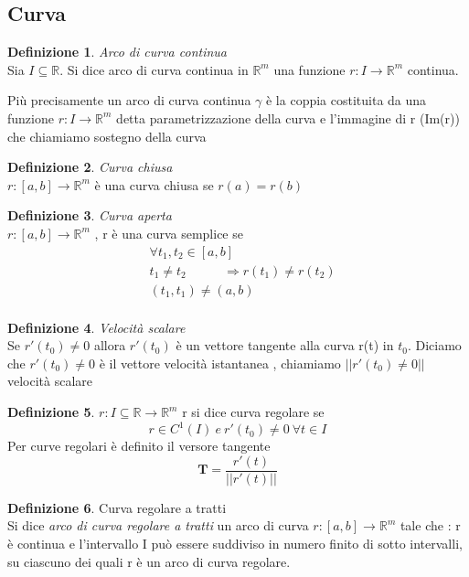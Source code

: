 \documentclass{article}
\theoremstyle{definition}
\newtheorem*{definizione}{Definizione}
\newcommand{\R}{\mathbb{R}}
\begin{document}
	\subsection{Curva}
	\begin{definizione}
		\textit{    Arco di curva continua \\
		}    Sia $ I \subseteq \R$. Si dice arco di curva continua in $\R^m$ una funzione $r:I \rightarrow \R^m$ continua.
	\end{definizione}
	Più precisamente un arco di curva continua $\gamma$ è la coppia costituita da una funzione $r:I \rightarrow \R^m$ detta parametrizzazione della curva e l'immagine di r (Im(r)) che chiamiamo sostegno della curva
	\begin{definizione}
		\textit{   Curva chiusa \\
		}    $r:[a,b] \rightarrow\R^m $ è una curva chiusa se $r(a)=r(b)$
	\end{definizione}
	\begin{definizione}
		\textit{Curva aperta} \\
		$r:[a,b] \rightarrow\R^m $ , r è una curva semplice se 
		\begin{equation*}
			\begin{split}
				&\forall t_1,t_2 \in [a,b] \\
				&t_1 \neq t_2 \qquad \ \ \ \  \Rightarrow r(t_1)\neq r(t_2) \\
				&(t_1,t_1)\neq ( a,b) \\
			\end{split}
		\end{equation*}
	\end{definizione}
	\begin{definizione}
		\textit{Velocità scalare}\\
		Se $r'(t_0)\neq 0$ allora $r'(t_0)$ è un vettore tangente alla curva r(t) in $t_0$. Diciamo che $r'(t_0)\neq 0$ è il vettore velocità istantanea , chiamiamo $||r'(t_0)\neq 0||$ velocità scalare
	\end{definizione}
	\begin{definizione}
		$r:I\subseteq\R \rightarrow \R^m$ r si dice curva regolare se $$r \in C^1(I) \ e \ r'(t_0)\neq 0  \  \forall t \in I $$
		Per curve regolari è definito il versore tangente 
		$$\textbf{T}= \frac{r'(t)}{||r'(t)||}$$
	\end{definizione}
	\begin{definizione}
		Curva regolare a tratti \\
		Si dice \textit{arco di curva regolare a tratti} un arco di curva $r:[a,b] \rightarrow\R^m $ tale che : r è continua e l'intervallo I può essere suddiviso in numero finito di sotto intervalli, su ciascuno dei quali r è un arco di curva regolare.   
	\end{definizione}
\end{document}

